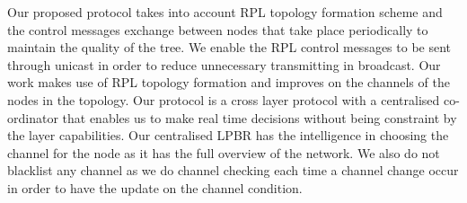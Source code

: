 Our proposed protocol takes into account RPL topology formation scheme and the control messages exchange between nodes that take place periodically to maintain the quality of the tree. We enable the RPL control messages to be sent through unicast in order to reduce unnecessary transmitting in broadcast. Our work makes use of RPL topology formation and improves on the channels of the nodes in the topology. Our protocol is a cross layer protocol with a centralised co-ordinator that enables us to make real time decisions without being constraint by the layer capabilities. Our centralised LPBR has the intelligence in choosing the channel for the node as it has the full overview of the network. We also do not blacklist any channel as we do channel checking each time a channel change occur in order to have the update on the channel condition.


